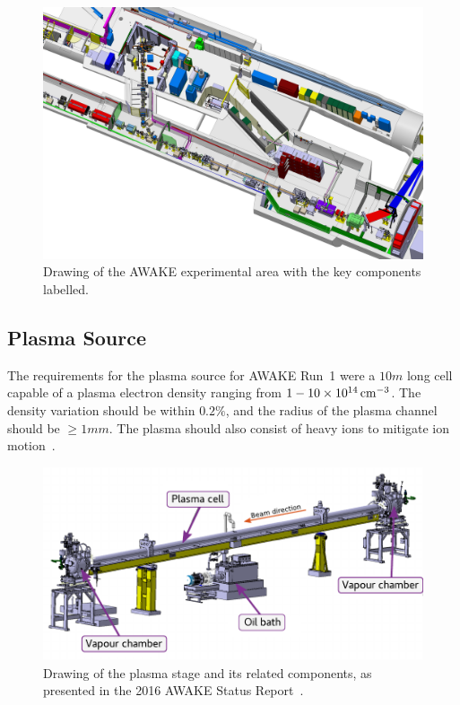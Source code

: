\begin{figure}[hbt]
    \centering
    \includegraphics[width=0.99\linewidth,trim={0mm 0mm 0mm 0mm},clip]{figures/AwakeExperiment}
    \caption{\label{Fig:WFA:AWAKE}
        Drawing of the AWAKE experimental area with the key components labelled.
    }
\end{figure}

\subsection{Plasma Source}
\label{WFA:Design:Plasma}

The requirements for the plasma source for AWAKE Run~1 were a $10\unit{m}$ long cell capable of a plasma electron density ranging from $1-10\times 10^{14}\,\mathrm{cm}^{-3}$.
The density variation should be within $0.2\%$, and the radius of the plasma channel should be $\geq 1\unit{mm}$.
The plasma should also consist of heavy ions to mitigate ion motion~\cite{caldwell:2015}.

\begin{figure}[hbt]
    \centering
    \includegraphics[width=0.99\linewidth,trim={0mm 0mm 0mm 0mm},clip]{figures/PlasmaCell}
    \caption{\label{Fig:WFA:PlasmaCell}
        Drawing of the plasma stage and its related components, as presented in the 2016 AWAKE Status Report~\cite{awake_collaboration:2016}.
    }
\end{figure}

